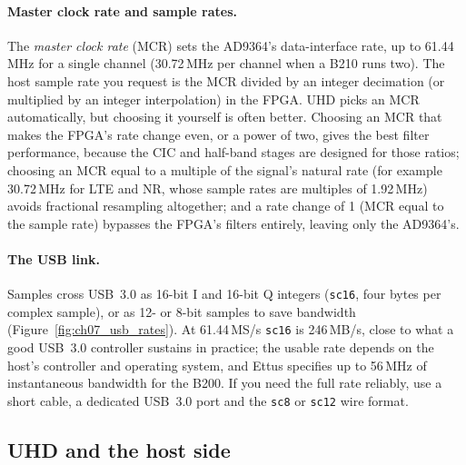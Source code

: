\paragraph{Master clock rate and sample rates.} The \emph{master clock rate} (MCR) sets the AD9364's
data-interface rate, up to 61.44\,MHz for a single channel (30.72\,MHz per channel when a B210 runs two).
The host sample rate you request is the MCR divided by an integer decimation (or multiplied by an integer
interpolation) in the FPGA. UHD picks an MCR automatically, but choosing it yourself is often better.
Choosing an MCR that makes the FPGA's rate change even, or a power of two, gives the best filter
performance, because the CIC and half-band stages are designed for those ratios; choosing an MCR equal to
a multiple of the signal's natural rate (for example 30.72\,MHz for LTE and NR, whose sample rates are
multiples of 1.92\,MHz) avoids fractional resampling altogether; and a rate change of 1 (MCR equal to the
sample rate) bypasses the FPGA's filters entirely, leaving only the AD9364's.

\paragraph{The USB link.} Samples cross USB~3.0 as 16-bit I and 16-bit Q integers (\texttt{sc16}, four
bytes per complex sample), or as 12- or 8-bit samples to save bandwidth (Figure~\ref{fig:ch07_usb_rates}).
At 61.44\,MS/s \texttt{sc16} is 246\,MB/s, close to what a good USB~3.0 controller sustains in practice;
the usable rate depends on the host's controller and operating system, and Ettus specifies up to
56\,MHz of instantaneous bandwidth for the B200. If you need the full rate reliably, use a short cable, a
dedicated USB~3.0 port and the \texttt{sc8} or \texttt{sc12} wire format.


\subsection{UHD and the host side}


